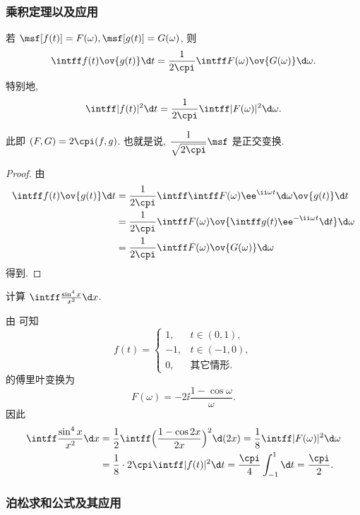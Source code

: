 \subsubsection{乘积定理以及应用}

\begin{theorem}[乘积定理]
  若 $\msf[f(t)]=F(\omega),\msf[g(t)]=G(\omega)$, 则
  \[
    \intff f(t)\ov{g(t)}\d t
    =\frac1{2\cpi}\intff F(\omega)\ov{G(\omega)}\d \omega.
  \]
  特别地,
  \[
    \intff |f(t)|^2\d t
    =\frac1{2\cpi}\intff |F(\omega)|^2\d \omega.
  \]
\end{theorem}

此即 $(F,G)=2\cpi(f,g)$.
也就是说, $\dfrac1{\sqrt{2\cpi}}\msf$ 是正交变换.

\begin{proof}
  由
  \begin{align*}
    \intff f(t)\ov{g(t)}\d t
    &=\frac1{2\cpi}\intff \intff F(\omega)\ee^{\ii \omega t}\d \omega \ov{g(t)}\d t\\
    &=\frac1{2\cpi}\intff F(\omega)\ov{\intff g(t)\ee^{-\ii \omega t}\d t}\d \omega\\
    &=\frac1{2\cpi}\intff F(\omega)\ov{G(\omega)}\d \omega
  \end{align*}
  得到.
\end{proof}

\begin{example}
  计算 $\intff \frac{\sin^4 x}{x^2}\d x$.
\end{example}

\begin{solution}
  由 可知
  \[
    f(t)=\begin{cases}
      1, &t\in(0,1),\\
      -1, &t\in(-1,0),\\
      0,&\text{其它情形.}
    \end{cases}
  \]
  的傅里叶变换为
  \[
    F(\omega)=-2\ii\frac{1-\cos \omega}{\omega}.
  \]
  因此
  \begin{align*}
    \intff \frac{\sin^4 x}{x^2}\d x
    &=\frac12\intff \Bigl(\frac{1-\cos 2x}{2x}\Bigr)^2\d (2x)
    =\frac18\intff |F(\omega)|^2\d \omega\\
    &=\frac18\cdot2\cpi\intff |f(t)|^2\d t
    =\frac\cpi 4\int_{-1}^1 \d t
    =\frac\cpi2.
  \end{align*}
\end{solution}


\subsubsection{泊松求和公式及其应用}

